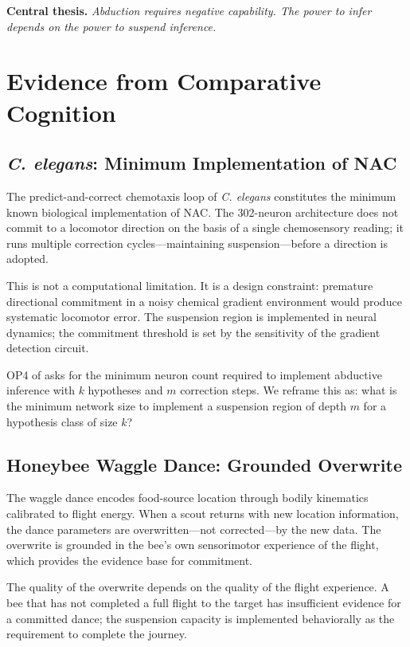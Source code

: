 \documentclass[12pt]{article}
\begin{document}
\medskip
\noindent
\textbf{Central thesis.}
\emph{Abduction requires negative capability.
The power to infer depends on the power to suspend inference.}

\section{Evidence from Comparative Cognition}

\subsection{\textit{C. elegans}: Minimum Implementation of NAC}

The predict-and-correct chemotaxis loop of \textit{C. elegans}
\cite{bargmann2006} constitutes the minimum known biological
implementation of NAC.
The 302-neuron architecture does not commit to a locomotor direction
on the basis of a single chemosensory reading; it runs multiple
correction cycles---maintaining suspension---before a direction is
adopted.

This is not a computational limitation.
It is a design constraint: premature directional commitment in a
noisy chemical gradient environment would produce systematic
locomotor error.
The suspension region is implemented in neural dynamics; the
commitment threshold is set by the sensitivity of the gradient
detection circuit.

OP4 of \cite{minamoto2026topology} asks for the minimum neuron count
required to implement abductive inference with $k$ hypotheses and
$m$ correction steps. We reframe this as: what is the minimum
network size to implement a suspension region of depth $m$ for a
hypothesis class of size $k$?

\subsection{Honeybee Waggle Dance: Grounded Overwrite}

The waggle dance \cite{riley2005} encodes food-source location through
bodily kinematics calibrated to flight energy.
When a scout returns with new location information, the dance parameters
are overwritten---not corrected---by the new data.
The overwrite is grounded in the bee's own sensorimotor experience of
the flight, which provides the evidence base for commitment.

The quality of the overwrite depends on the quality of the flight
experience. A bee that has not completed a full flight to the target
has insufficient evidence for a committed dance; the suspension capacity
is implemented behaviorally as the requirement to complete the journey.
\end{document}
